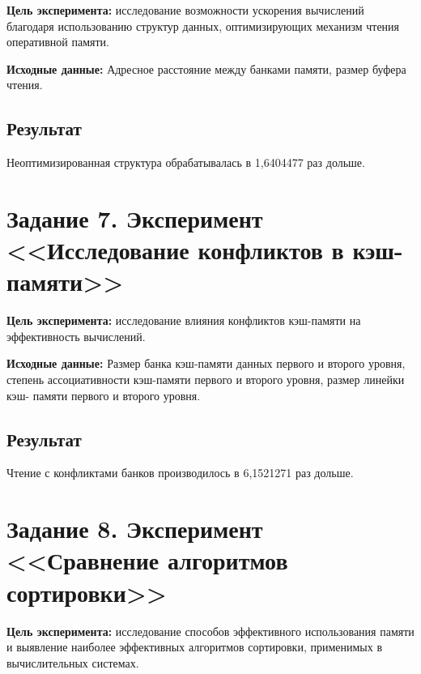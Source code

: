         \textbf{Цель эксперимента:}  исследование возможности ускорения вычислений благодаря использованию структур данных, оптимизирующих механизм чтения оперативной памяти.
        
        \textbf{Исходные   данные:}  Адресное расстояние между банками памяти, размер буфера чтения.
        
        
        \subsection*{Результат}
        
            Неоптимизированная структура обрабатывалась в 1,6404477 раз дольше.
            
    \newpage
        
    \section{Задание 7. Эксперимент <<Исследование конфликтов в кэш-памяти>>}
    
        \textbf{Цель   эксперимента:}  исследование   влияния   конфликтов   кэш-памяти   на эффективность вычислений.
        
        \textbf{Исходные   данные:}  Размер банка кэш-памяти данных первого и второго уровня, степень ассоциативности кэш-памяти первого и второго уровня, размер линейки кэш- памяти первого и второго уровня.
        
        
        \subsection*{Результат}
        
            Чтение с конфликтами банков производилось в 6,1521271 раз дольше.
    
    \newpage
    
    \section{Задание 8. Эксперимент <<Сравнение алгоритмов сортировки>>}
    
        \textbf{Цель эксперимента:} исследование способов эффективного использования  памяти и выявление наиболее эффективных алгоритмов сортировки, применимых в вычислительных системах.
        
